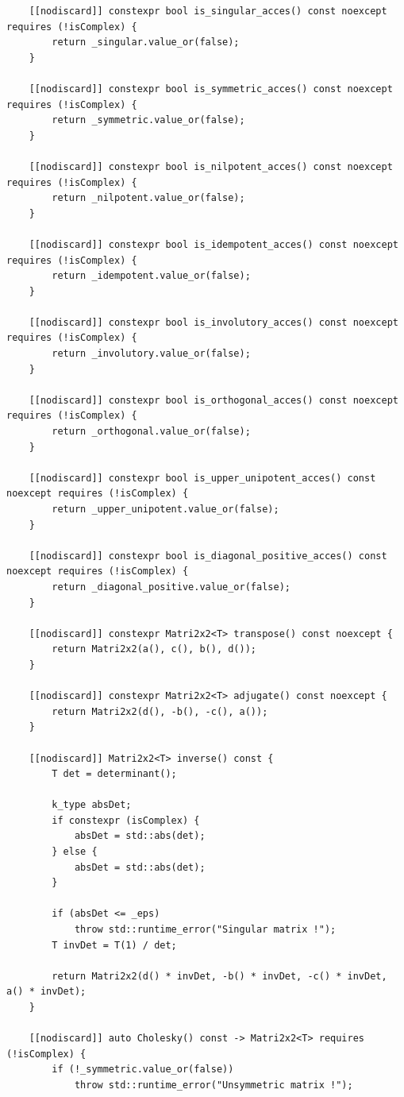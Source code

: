 \documentclass[11pt]{article}
\begin{document}
\begin{lstlisting}
    [[nodiscard]] constexpr bool is_singular_acces() const noexcept requires (!isComplex) {
        return _singular.value_or(false);
    }

    [[nodiscard]] constexpr bool is_symmetric_acces() const noexcept requires (!isComplex) {
        return _symmetric.value_or(false);
    }

    [[nodiscard]] constexpr bool is_nilpotent_acces() const noexcept requires (!isComplex) {
        return _nilpotent.value_or(false);
    }

    [[nodiscard]] constexpr bool is_idempotent_acces() const noexcept requires (!isComplex) {
        return _idempotent.value_or(false);
    }

    [[nodiscard]] constexpr bool is_involutory_acces() const noexcept requires (!isComplex) {
        return _involutory.value_or(false);
    }

    [[nodiscard]] constexpr bool is_orthogonal_acces() const noexcept requires (!isComplex) {
        return _orthogonal.value_or(false);
    }

    [[nodiscard]] constexpr bool is_upper_unipotent_acces() const noexcept requires (!isComplex) {
        return _upper_unipotent.value_or(false);
    }

    [[nodiscard]] constexpr bool is_diagonal_positive_acces() const noexcept requires (!isComplex) {
        return _diagonal_positive.value_or(false);
    }

    [[nodiscard]] constexpr Matri2x2<T> transpose() const noexcept {
        return Matri2x2(a(), c(), b(), d());
    }

    [[nodiscard]] constexpr Matri2x2<T> adjugate() const noexcept {
        return Matri2x2(d(), -b(), -c(), a());
    }

    [[nodiscard]] Matri2x2<T> inverse() const {
        T det = determinant();
        
        k_type absDet;
        if constexpr (isComplex) {
            absDet = std::abs(det);
        } else {
            absDet = std::abs(det);
        }
        
        if (absDet <= _eps)
            throw std::runtime_error("Singular matrix !");
        T invDet = T(1) / det;
        
        return Matri2x2(d() * invDet, -b() * invDet, -c() * invDet, a() * invDet);
    }

    [[nodiscard]] auto Cholesky() const -> Matri2x2<T> requires (!isComplex) {
        if (!_symmetric.value_or(false))
            throw std::runtime_error("Unsymmetric matrix !");


\end{lstlisting}
\end{document}
